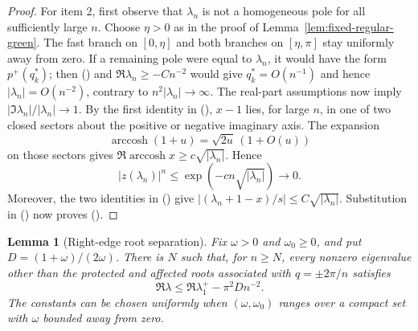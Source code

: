\documentclass[twoside,10pt]{article}
\numberwithin{equation}{section}
\theoremstyle{slbody}
\newtheorem{lemma}[theorem]{Lemma}
\theoremstyle{definition}
\theoremstyle{remark}
\renewcommand{\eqref}[1]{%
  \textup{{\normalfont(\oldstylenums{\ref{#1}}}\normalfont)}}
\begin{document}
\begin{proof}
For item 2, first observe that $\lambda_n$ is not a homogeneous pole
for all sufficiently large $n$.  Choose $\eta>0$ as in the proof of
Lemma~\ref{lem:fixed-regular-green}.  The fast branch on
$[0,\eta]$ and both branches on $[\eta,\pi]$ stay uniformly away from
zero.  If a remaining pole were equal to $\lambda_n$, it would have
the form $p^+(q_k^*)$; then \eqref{eq:fixed-small-wave-bounds} and
$\Re\lambda_n\ge-Cn^{-2}$ would give $q_k^*=O(n^{-1})$ and hence
$|\lambda_n|=O(n^{-2})$, contrary to
$n^2|\lambda_n|\to\infty$.  The real-part assumptions now imply
$|\Im\lambda_n|/|\lambda_n|\to1$.  By the first identity in
\eqref{eq:fixed-exact-x-identities}, $x-1$ lies, for large $n$, in one
of two closed sectors about the positive or negative imaginary axis.
The expansion
\[
 \operatorname{arccosh}(1+u)=\sqrt{2u}\,(1+O(u))
\]
on those sectors gives
$\Re\operatorname{arccosh}x\ge c\sqrt{|\lambda_n|}$.  Hence
\[
 |z(\lambda_n)|^n
 \le\exp(-cn\sqrt{|\lambda_n|})\longrightarrow0.
\]
Moreover, the two identities in
\eqref{eq:fixed-exact-x-identities} give
$|(\lambda_n+1-x)/s|\le C\sqrt{|\lambda_n|}$.  Substitution in
\eqref{eq:finite-green-z} now proves
\eqref{eq:fixed-unbounded-threshold-limit}.
\end{proof}

\begin{lemma}[Right-edge root separation]\label{lem:right-edge-separation}
Fix $\omega>0$ and $\omega_0\ge0$, and put
$D=(1+\omega)/(2\omega)$.  There is $N$ such that, for
$n\ge N$, every nonzero eigenvalue other than the protected and affected
roots associated with $q=\pm2\pi/n$ satisfies
\begin{equation}\label{eq:right-edge-separation}
 \Re\lambda\le \Re\lambda_1^+-\pi^2D n^{-2}.
\end{equation}
The constants can be chosen uniformly when $(\omega,\omega_0)$ ranges
over a compact set with $\omega$ bounded away from zero.
\end{lemma}
\end{document}
